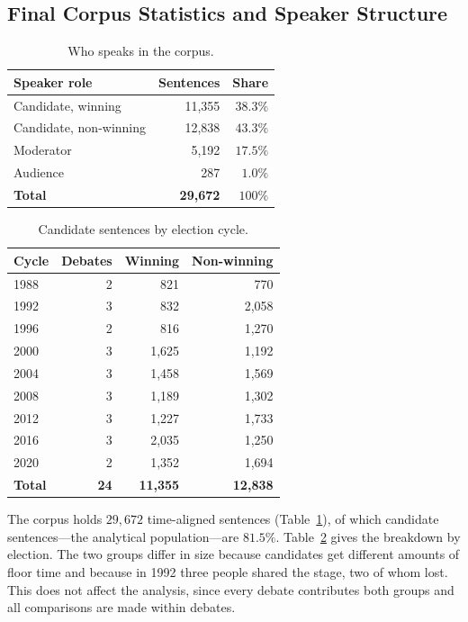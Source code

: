 \documentclass[journal]{IEEEtran}
\begin{document}
\subsection{Final Corpus Statistics and Speaker Structure}
\label{sec:data:stats}

\begin{table}[t]
\caption{Who speaks in the corpus.}
\label{tab:roles}
\centering
\begin{tabular}{lrr}
\toprule
Speaker role           & Sentences & Share \\
\midrule
Candidate, winning     & 11{,}355 & $38.3\%$ \\
Candidate, non-winning & 12{,}838 & $43.3\%$ \\
Moderator              & 5{,}192  & $17.5\%$ \\
Audience               & 287      & $1.0\%$ \\
\midrule
\textbf{Total}         & \textbf{29{,}672} & $100\%$ \\
\bottomrule
\end{tabular}
\end{table}

\begin{table}[t]
\caption{Candidate sentences by election cycle.}
\label{tab:corpus}
\centering
\begin{tabular}{lrrr}
\toprule
Cycle & Debates & Winning & Non-winning \\
\midrule
1988 & 2 & 821    & 770    \\
1992 & 3 & 832    & 2{,}058 \\
1996 & 2 & 816    & 1{,}270 \\
2000 & 3 & 1{,}625 & 1{,}192 \\
2004 & 3 & 1{,}458 & 1{,}569 \\
2008 & 3 & 1{,}189 & 1{,}302 \\
2012 & 3 & 1{,}227 & 1{,}733 \\
2016 & 3 & 2{,}035 & 1{,}250 \\
2020 & 2 & 1{,}352 & 1{,}694 \\
\midrule
\textbf{Total} & \textbf{24} & \textbf{11{,}355} & \textbf{12{,}838} \\
\bottomrule
\end{tabular}
\end{table}

The corpus holds $29{,}672$ time-aligned sentences (Table~\ref{tab:roles}), of
which candidate sentences---the analytical population---are $81.5\%$.
Table~\ref{tab:corpus} gives the breakdown by election. The two groups differ
in size because candidates get different amounts of floor time and because in
1992 three people shared the stage, two of whom lost. This does not affect the
analysis, since every debate contributes both groups and all comparisons are
made within debates.
\end{document}
